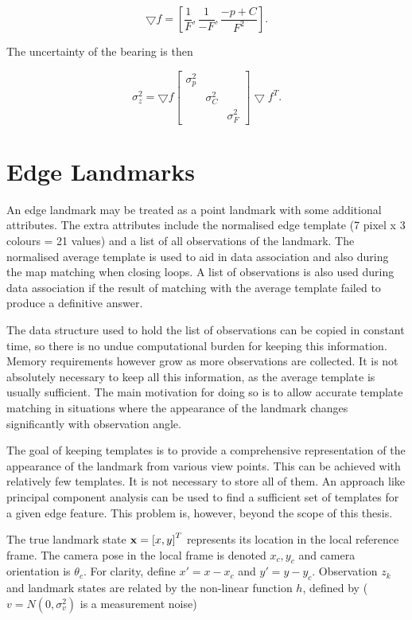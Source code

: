 $$
\bigtriangledown f = \left[ 
\frac{1}{F},
\frac{1}{-F},
\frac{-p + C}{F^2}
\right].
$$

The uncertainty of the bearing is then 

$$
\sigma^2_z = \bigtriangledown f \left[ \begin{array}{ccc}
      \sigma^2_p & & \\
   &  \sigma^2_C & \\
  & & \sigma^2_F 
\end{array} \right] \bigtriangledown f^T.
$$



\section{Edge Landmarks}

An edge landmark may be treated as a point landmark with some
additional attributes. The extra attributes include the normalised
edge template (7 pixel x 3 colours = 21 values) and a list of all
observations of the landmark.  The normalised average template is used
to aid in data association and also during the map matching when
closing loops. A list of observations is also used during data
association if the result of matching with the average template failed
to produce a definitive answer.

The data structure used to hold the list of observations can be copied
in constant time, so there is no undue computational burden for
keeping this information. Memory requirements however grow as more
observations are collected. It is not absolutely necessary to keep all
this information, as the average template is usually sufficient. The
main motivation for doing so is to allow accurate template matching in
situations where the appearance of the landmark changes significantly
with observation angle.

The goal of keeping templates is to provide a comprehensive
representation of the appearance of the landmark from various view
points. This can be achieved with relatively few templates. It is not
necessary to store all of them. An approach like principal component
analysis \cite{jolliffe2002pca} can be used to find a sufficient set
of templates for a given edge feature. This problem is, however, beyond
the scope of this thesis.

The true landmark state ${\bf x} = \left[x,y \right]^T$ represents its
location in the local reference frame. The camera pose in the local frame
is denoted $x_c,y_c$ and camera orientation is $\theta_c$. For clarity,
define $x'=x-x_c$ and $y'=y-y_c$. Observation $z_k$ and
landmark states are related by the non-linear function $h$, defined by
($v = N(0,\sigma_{v}^2)$ is a measurement noise)

